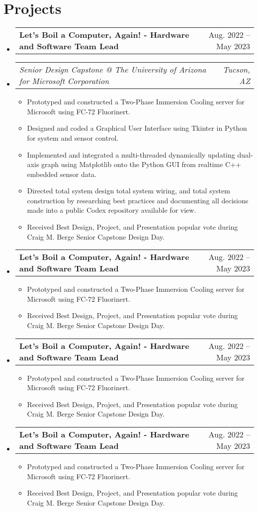 \documentclass[letterpaper,11pt]{article}
\makeatletter
\newcommand{\resumeItem}[1]{
  \item\small{
    {#1 \vspace{-2pt}}
  }
}
\newcommand{\resumeSubSubheading}[2]{
    \item
    \begin{tabular*}{0.97\textwidth}{l@{\extracolsep{\fill}}r}
      \textit{\small#1} & \textit{\small #2} \\
    \end{tabular*}\vspace{-7pt}
}
\newcommand{\resumeProjectHeading}[2]{
    \item
    \begin{tabular*}{0.97\textwidth}{l@{\extracolsep{\fill}}r}
      \small#1 & #2 \\
    \end{tabular*}\vspace{-7pt}
}
\newcommand{\resumeSubHeadingListStart}{\begin{itemize}[leftmargin=0.15in, label={}]}
\newcommand{\resumeSubHeadingListEnd}{\end{itemize}}
\newcommand{\resumeItemListStart}{\begin{itemize}}
\newcommand{\resumeItemListEnd}{\end{itemize}\vspace{-5pt}}
\makeatother
\begin{document}
\section{Projects}
    \resumeSubHeadingListStart
      \resumeProjectHeading
          {\textbf{Let's Boil a Computer, Again! - Hardware and Software Team Lead} }{Aug. 2022 -- May 2023}
          \resumeSubSubheading{Senior Design Capstone @ The University of Arizona for Microsoft Corporation}{Tucson, AZ}
          \resumeItemListStart
            \resumeItem{Prototyped and constructed a Two-Phase Immersion Cooling server for Microsoft using FC-72 Fluorinert.}
            \resumeItem{Designed and coded a Graphical User Interface using Tkinter in Python for system and sensor control.}
            \resumeItem{Implemented and integrated a multi-threaded dynamically updating dual-axis graph using Matplotlib onto the Python GUI from realtime C++ embedded sensor data.}
            \resumeItem{Directed total system design total system wiring, and total system construction by researching best practices and documenting all decisions made into a public Codex repository available for view.}
            \resumeItem{Received Best Design, Project, and Presentation popular vote during Craig M. Berge Senior Capstone Design Day.}
          \resumeItemListEnd
      \resumeProjectHeading
          {\textbf{Let's Boil a Computer, Again! - Hardware and Software Team Lead} }{Aug. 2022 -- May 2023}{}
          \resumeItemListStart
            \resumeItem{Prototyped and constructed a Two-Phase Immersion Cooling server for Microsoft using FC-72 Fluorinert.}
            \resumeItem{Received Best Design, Project, and Presentation popular vote during Craig M. Berge Senior Capstone Design Day.}
          \resumeItemListEnd
      \resumeProjectHeading
          {\textbf{Let's Boil a Computer, Again! - Hardware and Software Team Lead} }{Aug. 2022 -- May 2023}{}
          \resumeItemListStart
            \resumeItem{Prototyped and constructed a Two-Phase Immersion Cooling server for Microsoft using FC-72 Fluorinert.}
            \resumeItem{Received Best Design, Project, and Presentation popular vote during Craig M. Berge Senior Capstone Design Day.}
          \resumeItemListEnd
      \resumeProjectHeading
          {\textbf{Let's Boil a Computer, Again! - Hardware and Software Team Lead} }{Aug. 2022 -- May 2023}{}
          \resumeItemListStart
            \resumeItem{Prototyped and constructed a Two-Phase Immersion Cooling server for Microsoft using FC-72 Fluorinert.}
            \resumeItem{Received Best Design, Project, and Presentation popular vote during Craig M. Berge Senior Capstone Design Day.}
          \resumeItemListEnd
    \resumeSubHeadingListEnd
\end{document}
